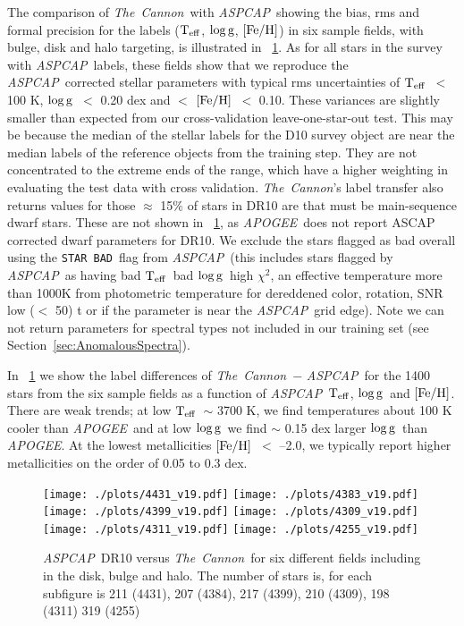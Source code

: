 \documentclass[12pt, preprint]{aastex}
\newcommand{\sectionname}{Section}
\newcommand{\tc}{\textsl{The~Cannon}}
\newcommand{\apogee}{\textsl{APOGEE}}
\newcommand{\aspcap}{\textsl{ASPCAP}}
\newcommand{\badstar}{\texttt{STAR BAD}}
\newcommand{\teff}{\mbox{$\rm T_{eff}$}}
\newcommand{\feh}{\mbox{$\rm [Fe/H]$}}
\newcommand{\logg}{\mbox{$\rm \log g$}}
\begin{document}
The comparison of \tc\ with \aspcap\, showing the bias, rms and formal precision for the labels (\teff , \logg , \feh ) in six sample fields, with bulge, disk and halo targeting, is illustrated in \figurename~\ref{fig:cal}. As for all stars in the survey with \aspcap\ labels, these fields show that we reproduce the \aspcap\ corrected stellar parameters with typical rms uncertainties of \teff\ $<$ 100 K, \logg\ $<$ 0.20 dex and $<$ \feh\ $<$ 0.10. These variances are slightly smaller than expected from our cross-validation leave-one-star-out test. This may be because the median of the stellar labels for the D10 survey object are near the median labels of the reference objects from the training step. 
They are not concentrated to the extreme ends of the range, which have a higher weighting in evaluating the test data with cross validation. 
 \tc 's label transfer also returns values for those $\approx$ 15\% of stars in DR10 are that must be main-sequence dwarf stars. 
These are not shown in \figurename~\ref{fig:cal}, as \apogee\ does not report ASCAP corrected dwarf parameters for DR10. 
We exclude the stars flagged as bad overall  using the \badstar\ flag from \aspcap\ (this includes stars flagged by \aspcap\ as having bad \teff\, bad \logg\, high $\chi^2$, an effective temperature more than 1000K from photometric temperature for dereddened color, rotation, SNR low ($<$ 50) t or if the parameter is near the \aspcap\ grid edge).  Note we can not return parameters for spectral types not included in our training set (see \sectionname~\ref{sec:AnomalousSpectra}). 

In \figurename~\ref{fig:cal} we show the label differences of \tc\ $-$ \aspcap\ for the 1400 stars from the six sample fields as a function of \aspcap\ \teff, \logg\ and \feh. There are weak trends; at low \teff\ $\sim$ 3700 K, we find temperatures about 100 K cooler than \apogee\ and at low \logg\ we find $\sim$ 0.15 dex larger \logg\ than \apogee. At the lowest metallicities \feh\ $<$ --2.0, we typically report higher metallicities on the order of 0.05 to 0.3 dex.


\begin{figure}[!h]
\centering
  \texttt{[image: ./plots/4431\_v19.pdf]}
    \texttt{[image: ./plots/4383\_v19.pdf]} \\
      \texttt{[image: ./plots/4399\_v19.pdf]}
        \texttt{[image: ./plots/4309\_v19.pdf]} \\
              \texttt{[image: ./plots/4311\_v19.pdf]}
        \texttt{[image: ./plots/4255\_v19.pdf]} 
\caption{\small{\aspcap\ DR10 versus \tc\ for six different fields including in the disk, bulge and halo. The number of stars is, for each subfigure is 211 (4431), 207 (4384), 217 (4399), 210 (4309), 198 (4311) 319 (4255) }}
\label{fig:cal}
\end{figure}
\end{document}
